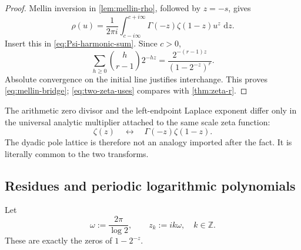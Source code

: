 \documentclass[11pt,a4paper]{article}
\theoremstyle{frontier}
\theoremstyle{definition}
\newcommand{\Z}{\mathbb Z}
\newcommand{\dd}{\,\mathrm d}
\begin{document}
\begin{proof}
Mellin inversion in \cref{lem:mellin-rho}, followed by $z=-s$, gives
\[
 \rho(u)=\frac1{2\pi i}\int_{c-i\infty}^{c+i\infty}
 \Gamma(-z)\zeta(1-z)u^z\,\dd z.
\]
Insert this in \eqref{eq:Psi-harmonic-sum}.  Since $c>0$,
\[
 \sum_{h\ge0}\binom h{r-1}2^{-hz}
 =\frac{2^{-(r-1)z}}{(1-2^{-z})^r}.
\]
Absolute convergence on the initial line justifies interchange.  This proves \eqref{eq:mellin-bridge}; \eqref{eq:two-zeta-uses} compares with \cref{thm:zeta-r}.
\end{proof}

\begin{resultbox}
The arithmetic zero divisor and the left-endpoint Laplace exponent differ only in the universal analytic multiplier attached to the same scale zeta function:
\[
 \zeta(z)\quad\longleftrightarrow\quad\Gamma(-z)\zeta(1-z).
\]
The dyadic pole lattice is therefore not an analogy imported after the fact.  It is literally common to the two transforms.
\end{resultbox}

\subsection{Residues and periodic logarithmic polynomials}

Let
\begin{equation}\label{eq:omega-zk}
  \omega:=\frac{2\pi}{\log2},
  \qquad z_k:=ik\omega,\quad k\in\Z.
\end{equation}
These are exactly the zeros of $1-2^{-z}$.
\end{document}
